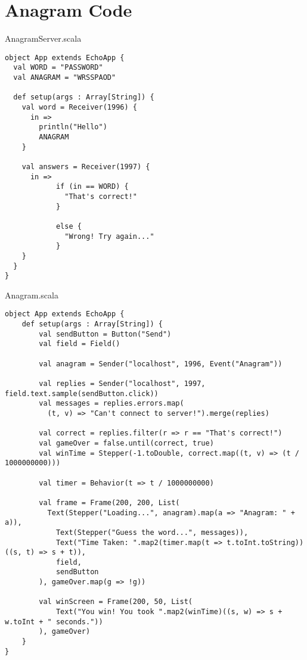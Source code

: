 \chapter{Anagram Code}

AnagramServer.scala

\begin{verbatim}
object App extends EchoApp {
  val WORD = "PASSWORD"
  val ANAGRAM = "WRSSPAOD"

  def setup(args : Array[String]) {	
    val word = Receiver(1996) {
      in =>
        println("Hello")
        ANAGRAM
    }

  	val answers = Receiver(1997) {
  	  in =>
  			if (in == WORD) {
  			  "That's correct!"
  			}

  			else {
  			  "Wrong! Try again..."
  			}
  	}
  }
}
\end{verbatim}

Anagram.scala

\begin{verbatim}
object App extends EchoApp {
	def setup(args : Array[String]) {
		val sendButton = Button("Send")
		val field = Field()

		val anagram = Sender("localhost", 1996, Event("Anagram"))

		val replies = Sender("localhost", 1997, field.text.sample(sendButton.click))
		val messages = replies.errors.map(
		  (t, v) => "Can't connect to server!").merge(replies)

		val correct = replies.filter(r => r == "That's correct!")
		val gameOver = false.until(correct, true)
		val winTime = Stepper(-1.toDouble, correct.map((t, v) => (t / 1000000000)))

		val timer = Behavior(t => t / 1000000000)

		val frame = Frame(200, 200, List(
		  Text(Stepper("Loading...", anagram).map(a => "Anagram: " + a)),
			Text(Stepper("Guess the word...", messages)),
			Text("Time Taken: ".map2(timer.map(t => t.toInt.toString))((s, t) => s + t)),
			field,
			sendButton
		), gameOver.map(g => !g))

		val winScreen = Frame(200, 50, List(
			Text("You win! You took ".map2(winTime)((s, w) => s + w.toInt + " seconds."))
		), gameOver)
	}
}
\end{verbatim}